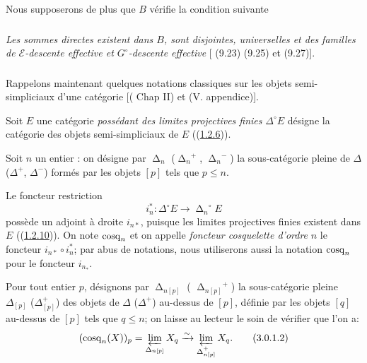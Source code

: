\documentclass[10pt]{../fichiers-configuration-latex/smfart}
\begin{document}
Nous supposerons de plus que $B$ vérifie la condition suivante

\setcounter{subsubsection}{-1}
\subsubsection{}
\emph{Les sommes directes existent dans $B$, sont disjointes, universelles
et des familles de $\mathcal{E}$-descente effective et
$G^{\circ}$-descente effective} [\cf \cite{SGA4-05bis:4} (9.23) (9.25) et (9.27)].

\subsubsection{}
Rappelons maintenant quelques notations classiques sur les objets
semi-simpliciaux d'une catégorie [\cf (\cite{SGA4-05bis:3} Chap II) et
  (V. appendice)].

Soit $E$ une catégorie \emph{possédant des limites projectives finies}
$\Delta^{\circ} E$ désigne la catégorie des objets semi-simpliciaux
de $E$ (\cf (\hyperref[Vbis.subsubsec1.2.6]{1.2.6})).

Soit $n$ un entier : on désigne par $\displaystyle\mathop{\Delta}_n$
(\resp $\displaystyle{\mathop{\Delta}_n}^+$,
$\displaystyle{\mathop{\Delta}_n}^-$) la
sous-catégorie pleine de $\Delta$ (\resp $\Delta^+$, $\Delta^-$)
formés par les objets $[p]$ tels que $p \leq n$.

Le foncteur restriction
\begin{equation*}
i_n^{\ast} : \Delta^{\circ} E \longrightarrow
{\mathop{\Delta}_n}^{\circ} E\tag{3.0.1.1}
\end{equation*}
possède un adjoint à droite $i_{n\ast}$, puisque les limites
projectives finies existent dans \pageoriginale $E$ (\cf (\hyperref[Vbis.lem1.2.10]{1.2.10})). On
note $\operatorname{cosq}_n$ et on appelle \emph{foncteur cosquelette d'ordre} $n$
le foncteur $i_{n\ast} \circ i^\ast_n$; par abus de notations, nous
utiliserons aussi la notation $\operatorname{cosq}_n$ pour le foncteur
$i_{n_\ast}$.

Pour tout entier $p$, désignons par
$\displaystyle\mathop{\Delta}_{n[p]}$ (\resp
$\displaystyle{\mathop{\Delta}_{n[p]}}^+$) la sous-catégorie pleine
$\Delta_{[p]}$ (\resp $\Delta_{[p]}^+$) des objets de $\Delta$
(\resp $\Delta^{+}$) au-dessus de $[p]$, définie par les objets
$[q]$ au-dessus de $[p]$ tels que $q \leq n$; on laisse au lecteur le
soin de vérifier que l'on a:
\begin{equation*}
(\operatorname{cosq}_n(X))_p = \varprojlim_{\mathop{\Delta}_{n[p]}} X_q
  \xrightarrow{\sim} \varprojlim_{\mathop{\Delta}_{n[p]}^{+}} X_q{}.\tag{3.0.1.2}
\end{equation*}
\end{document}
